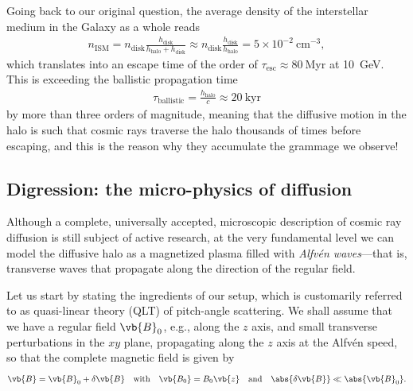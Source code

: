 Going back to our original question, the average density of the interstellar medium in
the Galaxy as a whole reads
\begin{align*}
  n_\text{ISM} = n_\text{disk} \frac{h_\text{disk}}{h_\text{halo} + h_\text{disk}} \approx
  n_\text{disk} \frac{h_\text{disk}}{h_\text{halo}} =
  5 \times 10^{-2}~\text{cm}^{-3},
\end{align*}
which translates into an escape time of the order of $\tau_\text{esc} \approx 80~$Myr
at 10~GeV.
This is exceeding the ballistic propagation time
\begin{align*}
  \tau_\text{ballistic} = \frac{h_\text{halo}}{c} \approx 20~\text{kyr}
\end{align*}
by more than three orders of magnitude, meaning that the diffusive motion in the
halo is such that cosmic rays traverse the halo thousands of times before escaping,
and this is the reason why they accumulate the grammage we observe!


\subsection{Digression: the micro-physics of diffusion}

Although a complete, universally accepted, microscopic description of cosmic ray
diffusion is still subject of active research, at the very fundamental level we can
model the diffusive halo as a magnetized plasma filled with \emph{Alfv\'en waves}---that
is, transverse waves that propagate along the direction of the regular field.

Let us start by stating the ingredients of our setup, which is customarily referred
to as quasi-linear theory (QLT) of pitch-angle scattering. We shall assume that we have
a regular field $\vb{B}_0$, e.g., along the $z$ axis, and small transverse perturbations in the $xy$
plane, propagating along the $z$ axis
at the Alfv\'en speed, so that the complete magnetic field is given by
\begin{align}
  \vb{B} = \vb{B}_0 + \delta \vb{B} \quad\text{with}\quad
  \vb{B_0} = B_0 \vb{z} \quad\text{and}\quad
  \abs{\delta \vb{B}} \ll \abs{\vb{B}_0}.
\end{align}

